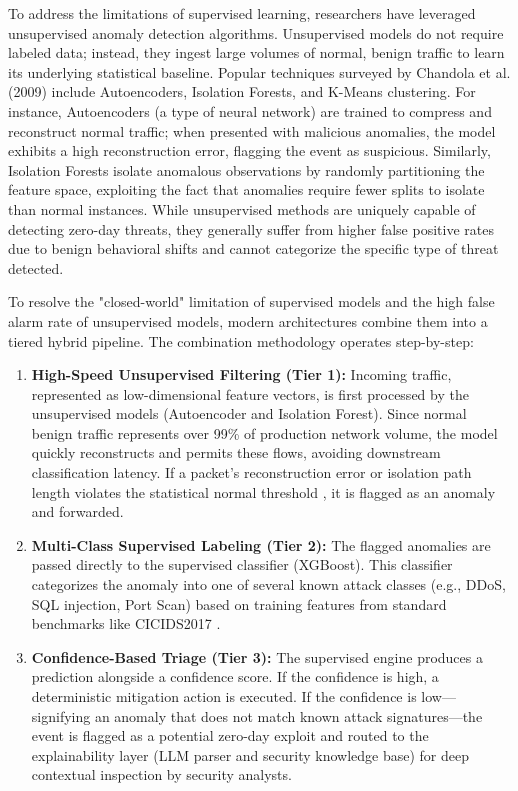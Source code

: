 \documentclass[12pt,a4paper]{report}
\begin{document}
To address the limitations of supervised learning, researchers have leveraged unsupervised anomaly detection algorithms. Unsupervised models do not require labeled data; instead, they ingest large volumes of normal, benign traffic to learn its underlying statistical baseline. Popular techniques surveyed by Chandola et al. (2009) \cite{chandola2009} include Autoencoders, Isolation Forests, and K-Means clustering. For instance, Autoencoders (a type of neural network) are trained to compress and reconstruct normal traffic; when presented with malicious anomalies, the model exhibits a high reconstruction error, flagging the event as suspicious. Similarly, Isolation Forests isolate anomalous observations by randomly partitioning the feature space, exploiting the fact that anomalies require fewer splits to isolate than normal instances. While unsupervised methods are uniquely capable of detecting zero-day threats, they generally suffer from higher false positive rates due to benign behavioral shifts and cannot categorize the specific type of threat detected.

To resolve the "closed-world" limitation of supervised models and the high false alarm rate of unsupervised models, modern architectures combine them into a tiered hybrid pipeline. The combination methodology operates step-by-step:
\begin{enumerate}[leftmargin=1.5em]
  \item \textbf{High-Speed Unsupervised Filtering (Tier 1):} Incoming traffic, represented as low-dimensional feature vectors, is first processed by the unsupervised models (Autoencoder and Isolation Forest). Since normal benign traffic represents over 99\% of production network volume, the model quickly reconstructs and permits these flows, avoiding downstream classification latency. If a packet's reconstruction error or isolation path length violates the statistical normal threshold \cite{chandola2009}, it is flagged as an anomaly and forwarded.
  \item \textbf{Multi-Class Supervised Labeling (Tier 2):} The flagged anomalies are passed directly to the supervised classifier (XGBoost). This classifier categorizes the anomaly into one of several known attack classes (e.g., DDoS, SQL injection, Port Scan) based on training features from standard benchmarks like CICIDS2017 \cite{sharafaldin2018}.
  \item \textbf{Confidence-Based Triage (Tier 3):} The supervised engine produces a prediction alongside a confidence score. If the confidence is high, a deterministic mitigation action is executed. If the confidence is low—signifying an anomaly that does not match known attack signatures—the event is flagged as a potential zero-day exploit and routed to the explainability layer (LLM parser and security knowledge base) for deep contextual inspection by security analysts.
\end{enumerate}
\end{document}
